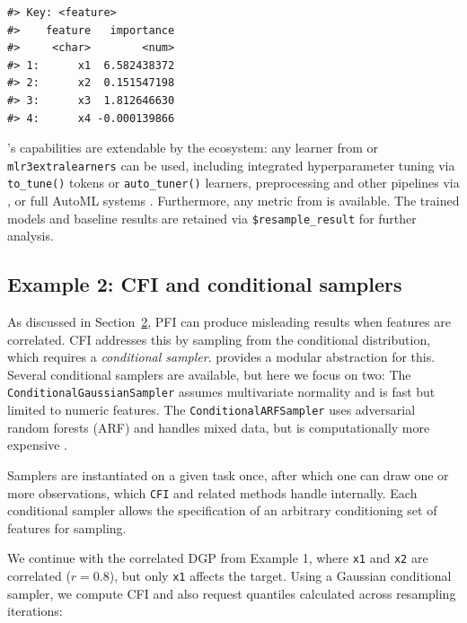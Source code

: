 \begin{verbatim}
#> Key: <feature>
#>    feature   importance
#>     <char>        <num>
#> 1:      x1  6.582438372
#> 2:      x2  0.151547198
#> 3:      x3  1.812646630
#> 4:      x4 -0.000139866
\end{verbatim}

's capabilities are extendable by the  ecosystem: any learner from  or \texttt{mlr3extralearners} \citep{fischer2025mlr3extralearnersexpanding} can be used, including integrated hyperparameter tuning via \texttt{to\_tune()} tokens or \texttt{auto\_tuner()} learners, preprocessing and other pipelines via , or full AutoML systems \citep{mlr3bookadvancedtuning, mlr3bookpipelinestuning}.
Furthermore, any metric from  is available.
The trained models and baseline results are retained via \texttt{\$resample\_result} for further analysis.

\subsection{Example 2: CFI and conditional samplers}\label{example-2-cfi-and-conditional-samplers}

As discussed in Section~\hyperref[sec-fi-methods]{2}, PFI can produce misleading results when features are correlated.
CFI addresses this by sampling from the conditional distribution, which requires a \emph{conditional sampler}.
 provides a modular abstraction for this.
Several conditional samplers are available, but here we focus on two:
The \texttt{ConditionalGaussianSampler} assumes multivariate normality and is fast but limited to numeric features.
The \texttt{ConditionalARFSampler} uses adversarial random forests (ARF) and handles mixed data, but is computationally more expensive \citep{watson2023adversarialrandom}.

Samplers are instantiated on a given task once, after which one can draw one or more observations, which \texttt{CFI} and related methods handle internally.
Each conditional sampler allows the specification of an arbitrary conditioning set of features for sampling.

We continue with the correlated DGP from Example 1, where \texttt{x1} and \texttt{x2} are correlated (\(r = 0.8\)), but only \texttt{x1} affects the target.
Using a Gaussian conditional sampler, we compute CFI and also request quantiles calculated across resampling iterations:

